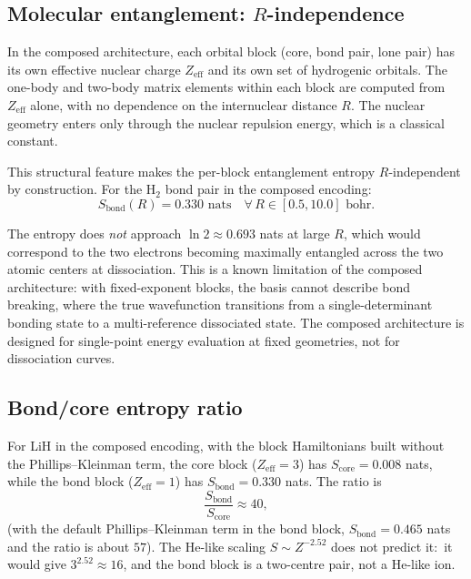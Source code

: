 \documentclass[twocolumn,pra,amsmath,amssymb,superscriptaddress]{revtex4-2}
\begin{document}
\subsection{Molecular entanglement: $R$-independence}

In the composed architecture, each orbital block (core, bond pair,
lone pair) has its own effective nuclear charge $Z_{\text{eff}}$
and its own set of hydrogenic orbitals.  The one-body and two-body
matrix elements within each block are computed from $Z_{\text{eff}}$
alone, with no dependence on the internuclear distance $R$.
The nuclear geometry enters only through the nuclear repulsion
energy, which is a classical constant.

This structural feature makes the per-block entanglement entropy
$R$-independent by construction.  For the H$_2$ bond pair in the
composed encoding:
\begin{equation}
  S_{\text{bond}}(R) = 0.330 \text{ nats}
  \quad \forall\, R \in [0.5, 10.0] \text{ bohr}.
  \label{eq:rindep}
\end{equation}

The entropy does \emph{not} approach $\ln 2 \approx 0.693$ nats
at large $R$, which would correspond to the two electrons becoming
maximally entangled across the two atomic centers at dissociation.
This is a known limitation of the composed architecture: with
fixed-exponent blocks, the basis cannot describe bond breaking,
where the true wavefunction transitions from a single-determinant
bonding state to a multi-reference dissociated state.  The
composed architecture is designed for single-point energy
evaluation at fixed geometries, not for dissociation curves.

\subsection{Bond/core entropy ratio}

For LiH in the composed encoding, with the block Hamiltonians built
without the Phillips--Kleinman term, the core block
($Z_{\text{eff}} = 3$) has $S_{\text{core}} = 0.008$ nats, while
the bond block ($Z_{\text{eff}} = 1$) has
$S_{\text{bond}} = 0.330$ nats.  The ratio is
\begin{equation}
  \frac{S_{\text{bond}}}{S_{\text{core}}} \approx 40,
  \label{eq:ratio}
\end{equation}
(with the default Phillips--Kleinman term in the bond block,
$S_{\text{bond}} = 0.465$ nats and the ratio is about $57$).  The
He-like scaling $S \sim Z^{-2.52}$ does not predict it:\ it would give
$3^{2.52} \approx 16$, and the bond block is a two-centre pair, not a
He-like ion.
\end{document}
